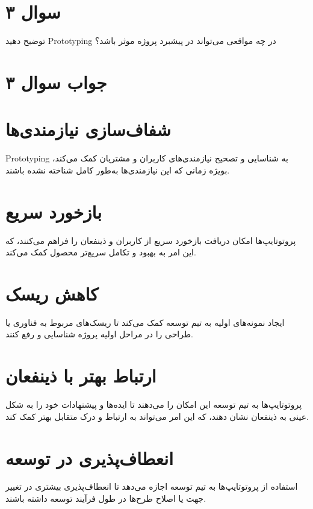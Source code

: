 \section*{سوال ۳}

توضیح دهید Prototyping در چه مواقعی می‌تواند در پیشبرد پروژه موثر باشد؟

\section*{جواب سوال ۳}

\section*{شفاف‌سازی نیازمندی‌ها}
Prototyping به شناسایی و تصحیح نیازمندی‌های کاربران و مشتریان کمک می‌کند، بویژه زمانی که این نیازمندی‌ها به‌طور کامل شناخته نشده باشند.

\section*{بازخورد سریع}
پروتوتایپ‌ها امکان دریافت بازخورد سریع از کاربران و ذینفعان را فراهم می‌کنند، که این امر به بهبود و تکامل سریع‌تر محصول کمک می‌کند.

\section*{کاهش ریسک}
ایجاد نمونه‌های اولیه به تیم توسعه کمک می‌کند تا ریسک‌های مربوط به فناوری یا طراحی را در مراحل اولیه پروژه شناسایی و رفع کنند.

\section*{ارتباط بهتر با ذینفعان}
پروتوتایپ‌ها به تیم توسعه این امکان را می‌دهند تا ایده‌ها و پیشنهادات خود را به شکل عینی به ذینفعان نشان دهند، که این امر می‌تواند به ارتباط و درک متقابل بهتر کمک کند.

\section*{انعطاف‌پذیری در توسعه}
استفاده از پروتوتایپ‌ها به تیم توسعه اجازه می‌دهد تا انعطاف‌پذیری بیشتری در تغییر جهت یا اصلاح طرح‌ها در طول فرآیند توسعه داشته باشند.
